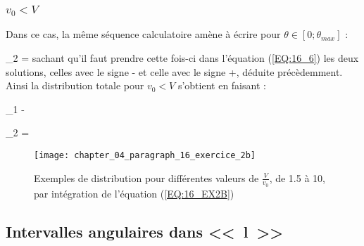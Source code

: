 \subsubsection{$v_{0} < V$}

Dans ce cas, la m\^eme s\'equence calculatoire am\`ene \`a \'ecrire pour $\theta \in [0;\theta_{max}]$ :
\be
	\begin{Bmatrix}\end{Bmatrix}_{2} = \sin\theta{}\theta
\ee
sachant qu'il faut prendre cette fois-ci dans l'\'equation (\ref{EQ:16_6}) les deux solutions, celles avec le signe - et celle avec le signe +, d\'eduite pr\'ec\`edemment. Ainsi la distribution totale pour $v_{0} < V$ s'obtient en faisant :
\be
	\begin{Bmatrix}\end{Bmatrix}_{1} - \begin{Bmatrix}\end{Bmatrix}_{2} = \sin\theta{}\theta\label{EQ:16_EX2B}
\ee

\begin{figure}[htb!]
	\begin{center}
		\texttt{[image: chapter\_04\_paragraph\_16\_exercice\_2b]}
		\caption{Exemples de distribution pour diff\'erentes valeurs de $\frac{V}{v_{0}}$, de 1.5 à 10, par int\'egration de l'\'equation (\ref{EQ:16_EX2B})}\label{FIG:4_16_EX2B}
	\end{center}
\end{figure}

\subsection{Intervalles angulaires dans <<~l~>>}

